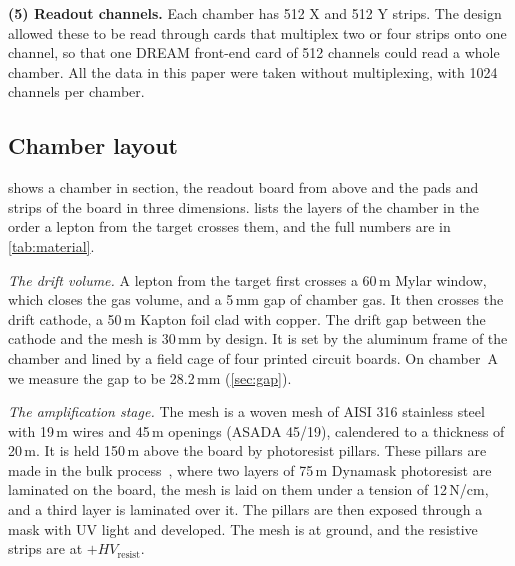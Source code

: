 \textbf{(5) Readout channels.} Each chamber has 512 X and 512 Y strips. The design allowed these to be read through
cards that multiplex two or four strips onto one channel, so that one DREAM front-end card of 512 channels could read a
whole chamber. All the data in this paper were taken without multiplexing, with 1024 channels per chamber.

\subsection{Chamber layout}
 shows a chamber in section, the readout board from above and the pads and strips of the board in
three dimensions.  lists the layers of the chamber in the order a lepton from the target crosses them,
and the full numbers are in \cref{tab:material}.

\emph{The drift volume.} A lepton from the target first crosses a 60\,\textmu m Mylar window, which closes the gas
volume, and a 5\,mm gap of chamber gas. It then crosses the drift cathode, a 50\,\textmu m Kapton foil clad with
copper. The drift gap between the cathode and the mesh is 30\,mm by design. It is set by the aluminum frame of the
chamber and lined by a field cage of four printed circuit boards. On chamber~A we measure the gap to be 28.2\,mm
(\cref{sec:gap}).

\emph{The amplification stage.} The mesh is a woven mesh of AISI 316 stainless steel with 19\,\textmu m wires and
45\,\textmu m openings (ASADA 45/19), calendered to a thickness of 20\,\textmu m. It is held 150\,\textmu m above the
board by photoresist pillars. These pillars are made in the bulk process~\cite{Giomataris2006bulk}, where two layers of
75\,\textmu m Dynamask photoresist are laminated on the board, the mesh is laid on them under a tension of 12\,N/cm,
and a third layer is laminated over it. The pillars are then exposed through a mask with UV light and developed. The
mesh is at ground, and the resistive strips are at $+HV_\mathrm{resist}$.

